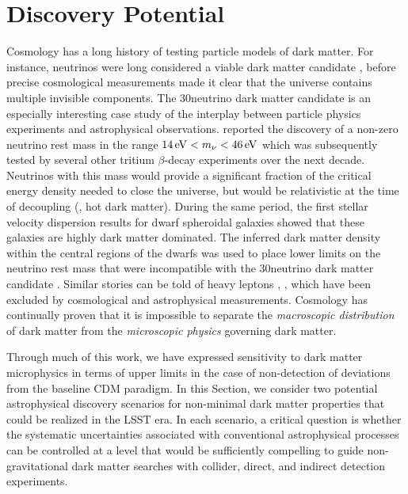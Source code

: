 \chapter{Discovery Potential }
\label{sec:discovery}
\bigskip
{}

Cosmology has a long history of testing particle models of dark matter.
For instance, neutrinos were long considered a viable dark matter candidate \citep[\eg,][]{Kolb:1988}, before precise cosmological measurements made it clear that the universe contains multiple invisible components.
The 30\eV neutrino dark matter candidate is an especially interesting case study of the interplay between particle physics experiments and astrophysical observations.
\citet{Lyubimov:1980un} reported the discovery of a non-zero neutrino rest mass in the range $14\mathrm{\,eV} < m_{\nu} < 46\mathrm{\,eV}$ which was subsequently tested by several other tritium $\beta$-decay experiments over the next decade.
Neutrinos with this mass would provide a significant fraction of the critical energy density needed to close the universe, but would be relativistic at the time of decoupling (\ie, hot dark matter).
During the same period, the first stellar velocity dispersion results for dwarf spheroidal galaxies showed that these galaxies are highly dark matter dominated.
The inferred dark matter density within the central regions of the dwarfs was used to place lower limits on the neutrino rest mass that were incompatible with the 30\eV neutrino dark matter candidate \citep{Aaronson:1983,Gerhard:1992}.
Similar stories can be told of heavy leptons \citep[\eg,][]{Gunn:1978}, , which have been excluded by cosmological and astrophysical measurements.
Cosmology has continually proven that it is impossible to separate the \emph{macroscopic distribution} of dark matter from the \emph{microscopic physics} governing dark matter.

Through much of this work, we have expressed sensitivity to dark matter microphysics in terms of upper limits in the case of non-detection of deviations from the baseline CDM paradigm.
In this Section, we consider two potential astrophysical discovery scenarios for non-minimal dark matter properties that could be realized in the LSST era.
In each scenario, a critical question is whether the systematic uncertainties associated with conventional astrophysical processes can be controlled at a level that would be sufficiently compelling to guide non-gravitational dark matter searches with collider, direct, and indirect detection experiments.


